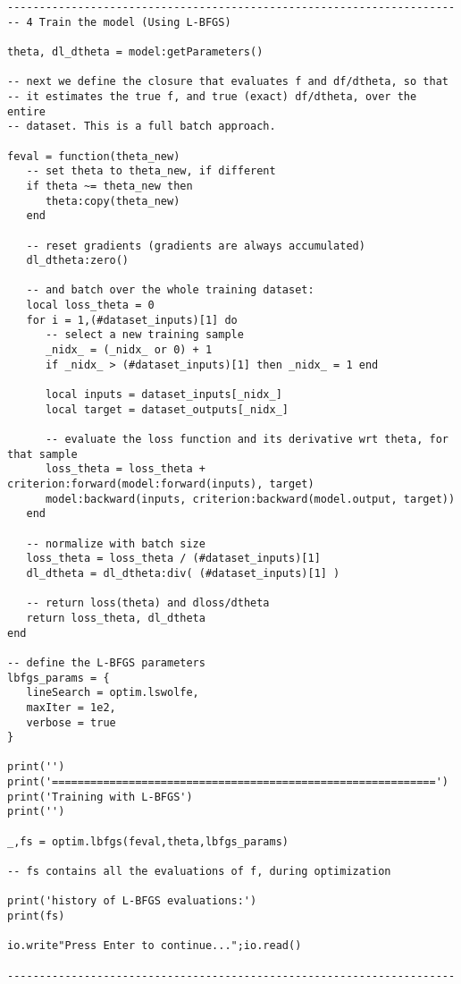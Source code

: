 \begin{verbatim}
----------------------------------------------------------------------
-- 4 Train the model (Using L-BFGS)

theta, dl_dtheta = model:getParameters()

-- next we define the closure that evaluates f and df/dtheta, so that
-- it estimates the true f, and true (exact) df/dtheta, over the entire
-- dataset. This is a full batch approach.

feval = function(theta_new)
   -- set theta to theta_new, if different
   if theta ~= theta_new then
      theta:copy(theta_new)
   end

   -- reset gradients (gradients are always accumulated)
   dl_dtheta:zero()

   -- and batch over the whole training dataset:
   local loss_theta = 0
   for i = 1,(#dataset_inputs)[1] do
      -- select a new training sample
      _nidx_ = (_nidx_ or 0) + 1
      if _nidx_ > (#dataset_inputs)[1] then _nidx_ = 1 end

      local inputs = dataset_inputs[_nidx_]
      local target = dataset_outputs[_nidx_]

      -- evaluate the loss function and its derivative wrt theta, for that sample
      loss_theta = loss_theta + criterion:forward(model:forward(inputs), target)
      model:backward(inputs, criterion:backward(model.output, target))
   end

   -- normalize with batch size
   loss_theta = loss_theta / (#dataset_inputs)[1]
   dl_dtheta = dl_dtheta:div( (#dataset_inputs)[1] )

   -- return loss(theta) and dloss/dtheta
   return loss_theta, dl_dtheta
end

-- define the L-BFGS parameters
lbfgs_params = {
   lineSearch = optim.lswolfe,
   maxIter = 1e2,
   verbose = true
}

print('')
print('============================================================')
print('Training with L-BFGS')
print('')

_,fs = optim.lbfgs(feval,theta,lbfgs_params)

-- fs contains all the evaluations of f, during optimization

print('history of L-BFGS evaluations:')
print(fs)

io.write"Press Enter to continue...";io.read()

----------------------------------------------------------------------
\end{verbatim}


